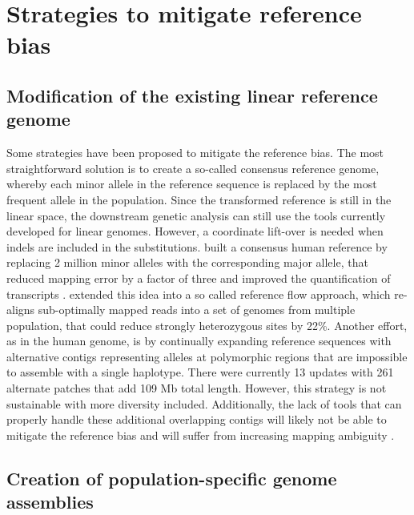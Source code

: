\documentclass[../main.tex]{subfiles}
\begin{document}
\section{Strategies to mitigate reference bias}

\subsection*{Modification of the existing linear reference genome}

Some strategies have been proposed to mitigate the reference bias. The most straightforward solution is to create a so-called consensus reference genome, whereby each minor allele in the reference sequence is replaced by the most frequent allele in the population. Since the transformed reference is still in the linear space, the downstream genetic analysis can still use the tools currently developed for linear genomes. However, a coordinate lift-over is needed when indels are included in the substitutions. \citet{ballouz2019time} built a consensus human reference by replacing 2 million minor alleles with the corresponding major allele, that reduced mapping error by a factor of three and improved the quantification of transcripts \citep{kaminow2020virtue}. \citet{chen2021reference} extended this idea into a so called reference flow approach, which re-aligns sub-optimally mapped reads into a set of genomes from multiple population, that could reduce strongly heterozygous sites by 22\%. Another effort, as in the human genome, is by continually expanding reference sequences with alternative contigs representing alleles at polymorphic regions that are impossible to assemble with a single haplotype. There were currently 13 updates with 261 alternate patches that add 109 Mb total length. However, this strategy is not sustainable with more diversity included. Additionally, the lack of tools that can properly handle these additional overlapping contigs will likely not be able to mitigate the reference bias and will suffer from increasing mapping ambiguity \citep{sherman2020pan}. 

\subsection*{Creation of population-specific genome assemblies}
\end{document}
